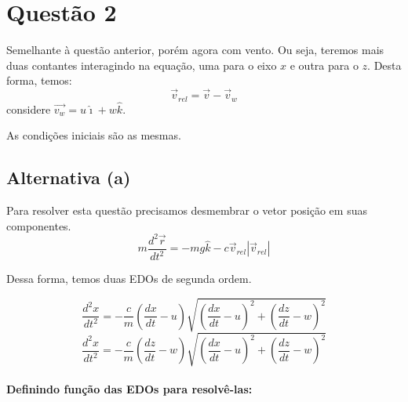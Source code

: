 \documentclass[12pt]{article}
\begin{document}
    \hypertarget{questuxe3o-2}{%
\section{Questão 2}\label{questuxe3o-2}}

Semelhante à questão anterior, porém agora com vento. Ou seja, teremos
mais duas contantes interagindo na equação, uma para o eixo \(x\) e
outra para o \(z\). Desta forma, temos:
\[\vec{v}_{rel} =\vec{v} - \vec{v}_w \] considere
\(\vec{v_w} = u\hat{\imath} + w\hat{k}\).

As condições iniciais são as mesmas.

\hypertarget{alternativa-a}{%
\subsection{Alternativa (a)}\label{alternativa-a}}

Para resolver esta questão precisamos desmembrar o vetor posição em suas
componentes.
\[ m \frac{d^2\vec{r}}{dt^2} =-mg\hat{k} - c\vec{v}_{rel}|\vec{v}_{rel}|\]

Dessa forma, temos duas EDOs de segunda ordem.

\[ \frac{d^2x}{dt^2} = - \frac{c}{m} \left(\frac{dx}{dt}-u\right) \sqrt{\left(\frac{dx}{dt}-u \right)^2 + \left(\frac{dz}{dt} - w \right)^2}
\]
\[ \frac{d^2x}{dt^2} = - \frac{c}{m} \left(\frac{dz}{dt}-w\right) \sqrt{\left(\frac{dx}{dt}-u \right)^2 + \left(\frac{dz}{dt} - w \right)^2}
\]

    \hypertarget{definindo-funuxe7uxe3o-das-edos-para-resolvuxea-las}{%
\paragraph{Definindo função das EDOs para
resolvê-las:}\label{definindo-funuxe7uxe3o-das-edos-para-resolvuxea-las}}
\end{document}
